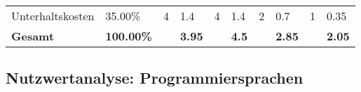 \begin{sidewaystable}[!htp]
\begin{tabular}{llllllllll}
		\rowcolor[HTML]{BBDAFF}
		Unterhaltskosten                          & 35.00\%                                 & 4                                                   & 1.4                                    & 4                                                   & 1.4                                    & 2                                                     & 0.7                                    & 1                                         & 0.35                                   \\
		\textbf{Gesamt}                           & \textbf{100.00\%}                       & \textbf{}                                           & \textbf{3.95}                          & \textbf{}                                           & \textbf{4.5}                           & \textbf{}                                             & \textbf{2.85}                          & \textbf{}                                 & \textbf{2.05}
	\end{tabular}
\end{sidewaystable}

\subsection{Nutzwertanalyse: Programmiersprachen}

